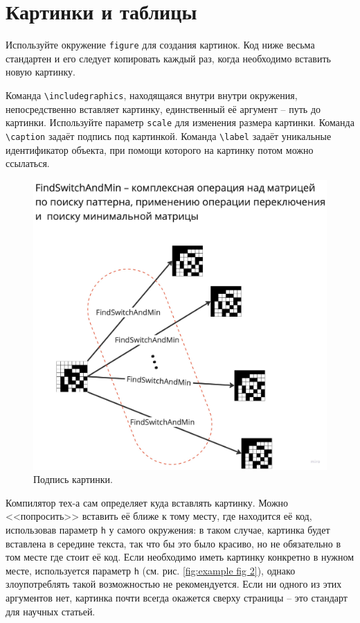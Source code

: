 \documentclass[a4paper, 14pt]{extreport}
\begin{document}
\section{Картинки и таблицы}

Используйте окружение \verb!figure! для создания картинок. Код ниже весьма стандартен и его следует копировать каждый раз, когда необходимо вставить новую картинку.

Команда \verb!\includegraphics!, находящаяся внутри внутри окружения, непосредственно вставляет картинку, единственный её аргумент -- путь до картинки. Используйте параметр \verb!scale! для изменения размера картинки. Команда \verb!\caption! задаёт подпись под картинкой. Команда \verb!\label! задаёт уникальные идентификатор объекта, при помощи которого на картинку потом можно ссылаться.

\begin{figure}[h]
    \centering 
    \includegraphics[scale=0.25]{img/graph.jpg}
    \caption{Подпись картинки.}
    \label{fig:example fig 1}
\end{figure}

Компилятор тех-а сам определяет куда вставлять картинку. Можно <<попросить>> вставить её ближе к тому месту, где находится её код, использовав параметр \verb!h! у самого окружения: в таком случае, картинка будет вставлена в середине текста, так что бы это было красиво, но не обязательно в том месте где стоит её код. Если необходимо иметь картинку конкретно в нужном месте, используется параметр \verb!h! (см. рис. \ref{fig:example fig 2}), однако злоупотреблять такой возможностью не рекомендуется. Если ни одного из этих аргументов нет, картинка почти всегда окажется сверху страницы -- это стандарт для научных статьей.
\end{document}
